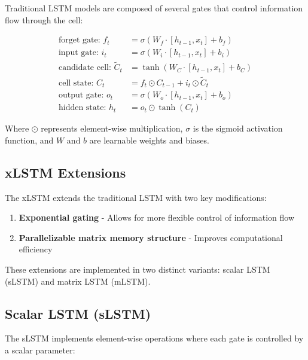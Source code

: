 \documentclass[11pt,a4paper]{article}
\begin{document}
Traditional LSTM models are composed of several gates that control information flow through the cell:

\begin{align}
\text{forget gate: } f_t &= \sigma(W_f \cdot [h_{t-1}, x_t] + b_f) \label{eq:forget_gate} \\
\text{input gate: } i_t &= \sigma(W_i \cdot [h_{t-1}, x_t] + b_i) \label{eq:input_gate} \\
\text{candidate cell: } \tilde{C}_t &= \tanh(W_C \cdot [h_{t-1}, x_t] + b_C) \label{eq:candidate_cell} \\
\text{cell state: } C_t &= f_t \odot C_{t-1} + i_t \odot \tilde{C}_t \label{eq:cell_state} \\
\text{output gate: } o_t &= \sigma(W_o \cdot [h_{t-1}, x_t] + b_o) \label{eq:output_gate} \\
\text{hidden state: } h_t &= o_t \odot \tanh(C_t) \label{eq:hidden_state}
\end{align}

Where $\odot$ represents element-wise multiplication, $\sigma$ is the sigmoid activation function, and $W$ and $b$ are learnable weights and biases.

\subsection{xLSTM Extensions}

The xLSTM extends the traditional LSTM with two key modifications:
\begin{enumerate}
    \item \textbf{Exponential gating} - Allows for more flexible control of information flow
    \item \textbf{Parallelizable matrix memory structure} - Improves computational efficiency
\end{enumerate}

These extensions are implemented in two distinct variants: scalar LSTM (sLSTM) and matrix LSTM (mLSTM).

\subsection{Scalar LSTM (sLSTM)}

The sLSTM implements element-wise operations where each gate is controlled by a scalar parameter:
\end{document}

